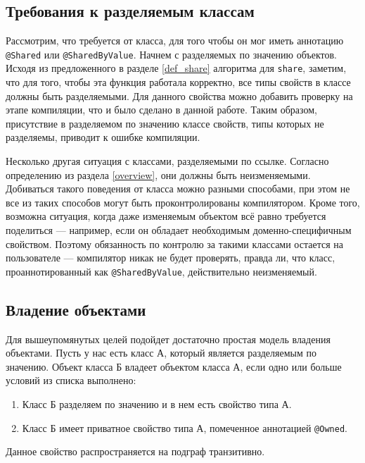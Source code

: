 \documentclass[specification,annotation,times]{itmo-student-thesis}
\begin{document}
\subsection{Требования к разделяемым классам}\label{shared_requirements}

Рассмотрим, что требуется от класса, для того чтобы он мог иметь аннотацию \texttt{@Shared} или \texttt{@SharedByValue}.
Начнем с разделяемых по значению объектов.
Исходя из предложенного в разделе \ref{def_share} алгоритма для
\texttt{share}, заметим, что для того, чтобы эта функция работала корректно,
все типы свойств в классе должны быть разделяемыми.
Для данного свойства можно добавить проверку на этапе компиляции, что и было сделано в данной работе.
Таким образом, присутствие в разделяемом  по значению классе свойств, типы которых не разделяемы, приводит к ошибке компиляции.

Несколько другая ситуация с классами, разделяемыми по ссылке. Согласно определению из раздела \ref{overview}, они должны быть неизменяемыми.
Добиваться такого поведения от класса можно разными способами, при этом не все из таких способов могут быть проконтролированы компилятором.
Кроме того, возможна ситуация, когда даже изменяемым объектом всё равно требуется поделиться --- например, если он обладает необходимым доменно-специфичным свойством.
Поэтому обязанность по контролю за такими классами остается на пользователе --- компилятор никак не будет проверять, правда ли, что класс, проаннотированный как \texttt{@SharedByValue}, действительно неизменяемый.

\subsection{Владение объектами}

Для вышеупомянутых целей подойдет достаточно простая модель владения объектами. Пусть у нас есть класс А, который является разделяемым по значению.
Объект класса Б владеет объектом класса А, если одно или больше условий из списка выполнено:

\begin{enumerate}
	\item Класс Б разделяем по значению и в нем есть свойство типа А.
	\item Класс Б имеет приватное свойство типа А, помеченное аннотацией \texttt{@Owned}.
\end{enumerate}

Данное свойство распространяется на подграф транзитивно.
\end{document}
